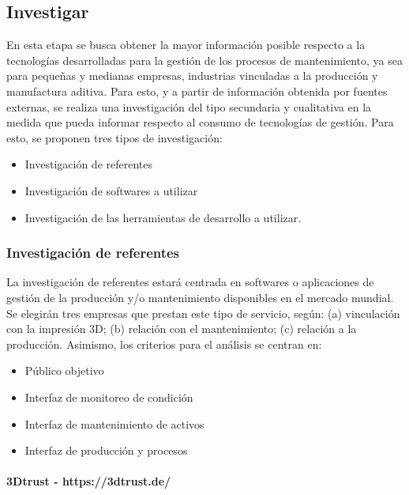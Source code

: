 \subsection{Investigar}

En esta etapa se busca obtener la mayor información posible respecto a la tecnologías desarrolladas para la gestión de los procesos de mantenimiento, ya sea para pequeñas y medianas empresas, industrias vinculadas a la producción y manufactura aditiva. Para esto, y a partir de información obtenida por fuentes externas, se realiza una investigación del tipo secundaria y cualitativa en la medida que pueda informar respecto al consumo de tecnologías de gestión. Para esto, se proponen tres tipos de investigación:

\begin{itemize}

\item Investigación de referentes 
\item Investigación de softwares a utilizar
\item Investigación de las herramientas de desarrollo a utilizar.
\end{itemize}

\subsubsection{Investigación de referentes}

La investigación de referentes estará centrada en softwares o aplicaciones de gestión de la producción y/o mantenimiento disponibles en el mercado mundial. Se elegirán tres empresas que prestan este tipo de servicio, según: (a) vinculación con la impresión 3D; (b) relación con el mantenimiento; (c) relación a la producción. Asimismo, los criterios para el análisis se centran en:
\begin{itemize}
\item Público objetivo
\item Interfaz de monitoreo de condición
\item Interfaz de mantenimiento de activos
\item Interfaz de producción y procesos

\end{itemize}

\paragraph{3Dtrust - https://3dtrust.de/}

